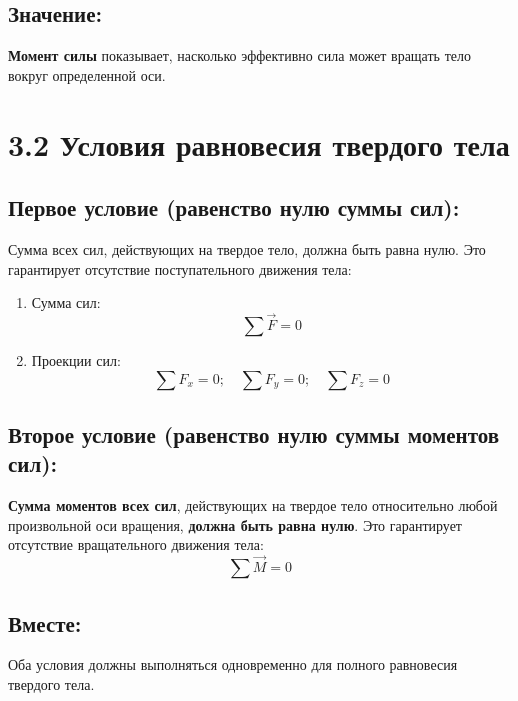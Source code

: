 \documentclass[a4paper,12pt]{article}
\begin{document}
\vspace{-9pt}
\subsection*{Значение:}
\vspace{-3pt}

\textbf{Момент силы} показывает, насколько эффективно сила может вращать тело вокруг определенной оси.




\section*{3.2 Условия равновесия твердого тела}
\vspace{-9pt}
\subsection*{Первое условие (равенство нулю суммы сил):}
\vspace{-3pt}
Сумма всех сил, действующих на твердое тело, должна быть равна нулю. Это гарантирует отсутствие поступательного движения тела:
\begin{enumerate}[itemsep=0pt, topsep=0pt, parsep=2pt]
  \item Сумма сил:
    \vspace{-0.05em}
    $$ \sum{\vec{F}} = 0 $$
  \item Проекции сил:
    \vspace{-0.05em}
    $$ \sum F_x = 0; \quad \sum F_y = 0; \quad \sum F_z = 0 $$
\end{enumerate}

\vspace{-9pt}
\subsection*{Второе условие (равенство нулю суммы моментов сил):}
\vspace{-3pt}
\textbf{Сумма моментов всех сил}, действующих на твердое тело относительно любой произвольной оси вращения, \textbf{должна быть равна нулю}. Это гарантирует отсутствие вращательного движения тела:
$$\sum{\vec{M}} = 0$$

\vspace{-9pt}
\subsection*{Вместе:}
\vspace{-3pt}
Оба условия должны выполняться одновременно для полного равновесия твердого тела.
\end{document}

